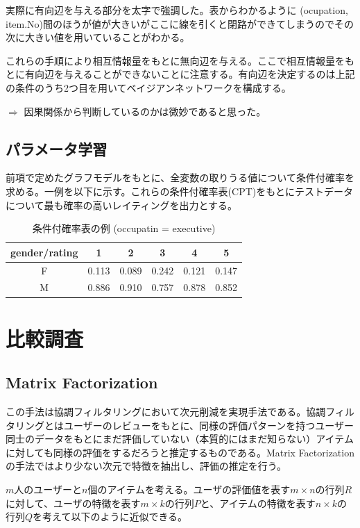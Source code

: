 \documentclass[a4paper,12pt]{jarticle}
\begin{document}
実際に有向辺を与える部分を太字で強調した。表からわかるように (ocupation, item.No)間のほうが値が大きいがここに線を引くと閉路ができてしまうのでその次に大きい値を用いていることがわかる。

これらの手順により相互情報量をもとに無向辺を与える。ここで相互情報量をもとに有向辺を与えることができないことに注意する。有向辺を決定するのは上記の条件のうち2つ目を用いてベイジアンネットワークを構成する。

$\Rightarrow$ 因果関係から判断しているのかは微妙であると思った。

\subsection{パラメータ学習}

前項で定めたグラフモデルをもとに、全変数の取りうる値について条件付確率を求める。一例を以下に示す。これらの条件付確率表(CPT)をもとにテストデータについて最も確率の高いレイティングを出力とする。

\begin{table}[H]
\begin{center}
\caption{条件付確率表の例 (occupatin = executive)}
\begin{tabular}{|c||c|c|c|c|c|} \hline  
gender/rating & 1 & 2 & 3 & 4 & 5 \\ \hline \hline
F & 0.113 & 0.089 & 0.242 & 0.121 & 0.147 \\
M & 0.886 & 0.910 & 0.757 & 0.878 & 0.852 \\ \hline
\end{tabular}
\end{center}
\end{table}

\section{比較調査}

\subsection{Matrix Factorization}

この手法は協調フィルタリングにおいて次元削減を実現手法である。協調フィルタリングとはユーザーのレビューをもとに、同様の評価パターンを持つユーザー同士のデータをもとにまだ評価していない（本質的にはまだ知らない）アイテムに対しても同様の評価をするだろうと推定するものである。Matrix Factorization の手法ではより少ない次元で特徴を抽出し、評価の推定を行う。

$m$人のユーザーと$n$個のアイテムを考える。ユーザの評価値を表す$m \times n$の行列$R$に対して、ユーザの特徴を表す$m \times k$の行列$P$と、アイテムの特徴を表す$n \times k$の行列$Q$を考えて以下のように近似できる。
\end{document}
